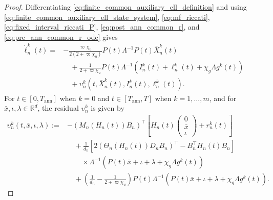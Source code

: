 \documentclass[12pt]{article}
\numberwithin{equation}{section}
\theoremstyle{definition}
\begin{document}
\begin{proof}
Differentiating \eqref{eq:finite_common_auxiliary_ell_definition} and using
\eqref{eq:finite_common_auxiliary_ell_state_system},
\eqref{eq:mf_riccati}, \eqref{eq:fixed_interval_riccati_P},
\eqref{eq:post_ann_common_r}, and
\eqref{eq:pre_ann_common_r_ode} gives
\begin{equation}\label{eq:finite_common_auxiliary_ell_equation}
\begin{aligned}
\dot\ell_n^k(t)
={}&
-\frac{\varpi\chi_u}{2(2+\varpi\chi_u)}
P(t)\Lambda^{-1}P(t)\bar X_n^k(t)
\\
&\quad
+\frac{1}{2+\varpi\chi_u} P(t)\Lambda^{-1}
\left(
I_n^k(t)+\ell_n^k(t)+\chi_g\Lambda g^k(t)
\right)
\\
&\quad
+\upsilon_n^k
\left(
t,\bar X_n^k(t),I_n^k(t),\ell_n^k(t)
\right).
\end{aligned}
\end{equation}
For \(t\in[0,T_{\mathrm{ann}}]\) when \(k=0\) and
\(t\in[T_{\mathrm{ann}},T]\) when \(k=1,\ldots,m\), and for
\(\bar x,\iota,\lambda\in\mathbb R^d\), the residual \(\upsilon_n^k\) is given by
\begin{equation}\label{eq:finite_common_auxiliary_ell_residual_identity}
\begin{aligned}
\upsilon_n^k(t,\bar x,\iota,\lambda)
:={}&
-\left(
M_n(H_n(t))B_n
\right)^\top
\left[
H_n(t)
\begin{pmatrix}
0\\
\bar x\\
\iota
\end{pmatrix}
+r_n^k(t)
\right]
\\
&\quad
+\frac1{d_n}
\left[
2\left(
\Theta_n(H_n(t))D_nB_n
\right)^\top
-B_n^\top H_n(t)B_n
\right]
\\
&\qquad {}\times
\Lambda^{-1}
\left(
P(t)\bar x+\iota+\lambda+\chi_g\Lambda g^k(t)
\right)
\\
&\quad
+\left(
\frac1{d_n}-\frac{1}{2+\varpi\chi_u}
\right)
P(t)\Lambda^{-1}
\left(
P(t)\bar x+\iota+\lambda+\chi_g\Lambda g^k(t)
\right).
\end{aligned}
\end{equation}


\end{proof}
\end{document}
